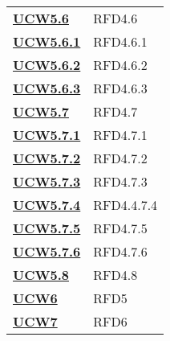 \begin{longtable}[H]{| >{\centering\bfseries}p{8cm} | >{\centering\arraybackslash}p{8cm} |}
    \hyperref[ssub:ucw5.6]{UCW5.6}     & RFD4.6                                                                    \\

    \hyperref[par:ucw5.6.1]{UCW5.6.1}  & RFD4.6.1                                                                  \\

    \hyperref[par:ucw5.6.2]{UCW5.6.2}  & RFD4.6.2                                                                  \\

    \hyperref[par:ucw5.6.3]{UCW5.6.3}  & RFD4.6.3                                                                  \\


    \hyperref[ssub:ucw5.7]{UCW5.7}     & RFD4.7                                                                    \\

    \hyperref[par:ucw5.7.1]{UCW5.7.1}  & RFD4.7.1                                                                  \\

    \hyperref[par:ucw5.7.2]{UCW5.7.2}  & RFD4.7.2                                                                  \\

    \hyperref[par:ucw5.7.3]{UCW5.7.3}  & RFD4.7.3                                                                  \\

    \hyperref[par:ucw5.7.4]{UCW5.7.4}  & RFD4.4.7.4                                                                \\

    \hyperref[spar:ucw5.7.5]{UCW5.7.5} & RFD4.7.5                                                                  \\

    \hyperref[spar:ucw5.7.6]{UCW5.7.6} & RFD4.7.6                                                                  \\

    \hyperref[ssub:ucw5.8]{UCW5.8}     & RFD4.8                                                                    \\

    \hyperref[sub:ucw6]{UCW6}          & RFD5                                                                      \\

    \hyperref[sub:ucw7]{UCW7}          & RFD6                                                                      \\


\end{longtable}
